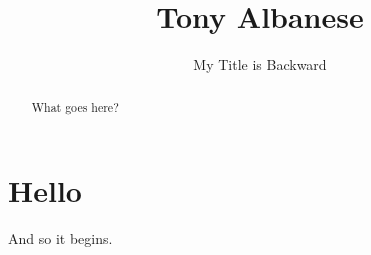 \documentclass[]{article}
\title{Tony Albanese}
\author{My Title is Backward}
\begin{document}
\maketitle

\begin{abstract}
What goes here?
\end{abstract}

\section{Hello}
And so it begins.
\end{document}
